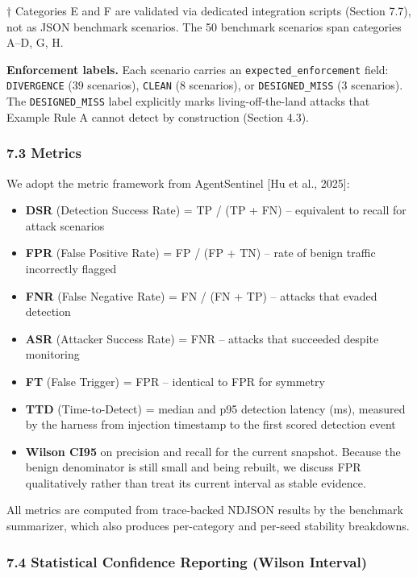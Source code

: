\documentclass[
]{article}
\providecommand{\tightlist}{%
  \setlength{\itemsep}{0pt}\setlength{\parskip}{0pt}}
\begin{document}
† Categories E and F are validated via dedicated integration scripts
(Section 7.7), not as JSON benchmark scenarios. The 50 benchmark
scenarios span categories A--D, G, H.

\textbf{Enforcement labels.} Each scenario carries an
\texttt{expected\_enforcement} field: \texttt{DIVERGENCE} (39
scenarios), \texttt{CLEAN} (8 scenarios), or \texttt{DESIGNED\_MISS} (3
scenarios). The \texttt{DESIGNED\_MISS} label explicitly marks
living-off-the-land attacks that Example Rule A cannot detect by
construction (Section 4.3).

\subsubsection{7.3 Metrics}\label{metrics}

We adopt the metric framework from AgentSentinel {[}Hu et al., 2025{]}:

\begin{itemize}
\tightlist
\item
  \textbf{DSR} (Detection Success Rate) = TP / (TP + FN) -- equivalent
  to recall for attack scenarios
\item
  \textbf{FPR} (False Positive Rate) = FP / (FP + TN) -- rate of benign
  traffic incorrectly flagged
\item
  \textbf{FNR} (False Negative Rate) = FN / (FN + TP) -- attacks that
  evaded detection
\item
  \textbf{ASR} (Attacker Success Rate) = FNR -- attacks that succeeded
  despite monitoring
\item
  \textbf{FT} (False Trigger) = FPR -- identical to FPR for symmetry
\item
  \textbf{TTD} (Time-to-Detect) = median and p95 detection latency (ms),
  measured by the harness from injection timestamp to the first scored
  detection event
\item
  \textbf{Wilson CI95} on precision and recall for the current snapshot.
  Because the benign denominator is still small and being rebuilt, we
  discuss FPR qualitatively rather than treat its current interval as
  stable evidence.
\end{itemize}

All metrics are computed from trace-backed NDJSON results by the
benchmark summarizer, which also produces per-category and per-seed
stability breakdowns.

\subsubsection{7.4 Statistical Confidence Reporting (Wilson
Interval)}\label{statistical-confidence-reporting-wilson-interval}
\end{document}
